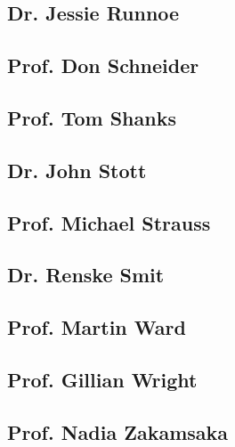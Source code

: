 \subsection{Dr. Jessie Runnoe}


\subsection{Prof. Don Schneider}


\subsection{Prof. Tom Shanks}	


\subsection{Dr. John Stott}


\subsection{Prof. Michael  Strauss}


\subsection{Dr. Renske Smit}		


\subsection{Prof. Martin Ward}		


\subsection{Prof. Gillian Wright}


\subsection{Prof. Nadia Zakamsaka} 